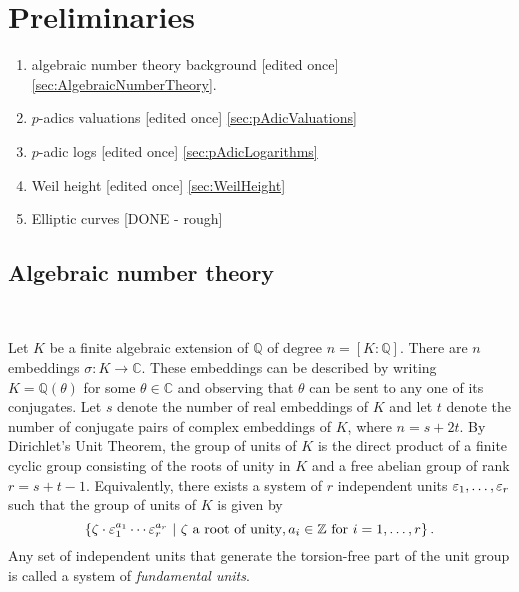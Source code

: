
\chapter{Preliminaries}
\label{ch:Preliminaries}

\begin{enumerate}
\item algebraic number theory background [edited once] \autoref{sec:AlgebraicNumberTheory}.
\item $p$-adics valuations [edited once] \autoref{sec:pAdicValuations}
\item $p$-adic logs [edited once] \autoref{sec:pAdicLogarithms}
\item Weil height [edited once] \autoref{sec:WeilHeight}
\item Elliptic curves [DONE - rough]
\end{enumerate}


\section{Algebraic number theory} 
\label{sec:AlgebraicNumberTheory}

\\

Let $K$ be a finite algebraic extension of $\mathbb{Q}$ of degree $n = [K:\mathbb{Q}]$. There are $n$ embeddings $\sigma: K \to \mathbb{C}$. These embeddings can be described by writing $K = \mathbb{Q}(\theta)$ for some $\theta \in \mathbb{C}$ and observing that $\theta$ can be sent to any one of its conjugates. 
Let $s$ denote the number of real embeddings of $K$ and let $t$ denote the number of conjugate pairs of complex embeddings of $K$, where $n = s + 2t$. By Dirichlet's Unit Theorem, the group of units of $K$ is the direct product of a finite cyclic group consisting of the roots of unity in $K$ and a free abelian group of rank $r = s + t -1$. Equivalently, there exists a system of $r$ independent units $\varepsilon_1, \dots, \varepsilon_r$ such that the group of units of $K$ is given by 
\[\left\{\zeta \cdot \varepsilon_1^{a_1}\cdots \varepsilon_r^{a_r} \ | \ \zeta \text{ a root of unity}, a_i \in \mathbb{Z} \text{ for } i = 1, \dots, r\right\}.\]
Any set of independent units that generate the torsion-free part of the unit group is called a system of \textit{fundamental units}. 

